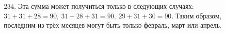 234. Эта сумма может получиться только в следующих случаях: $31+31+28=90,\ 31+28+31=90,\ 29+31+30=90.$ Таким образом, последним из трёх месяцев могут быть только февраль, март или апрель.\\
